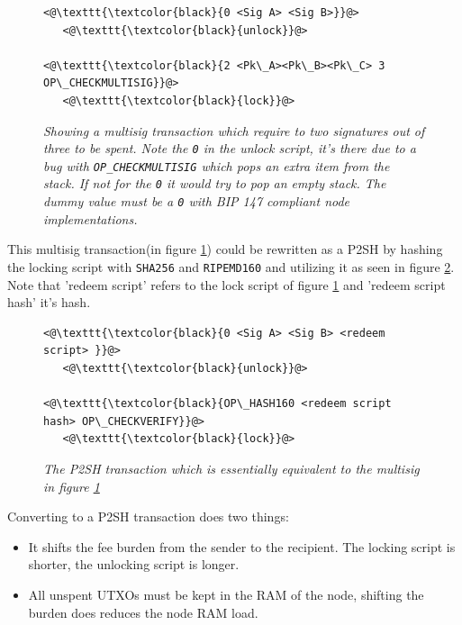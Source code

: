 \begin{figure}
	\centering
	\begin{lstlisting}
<@\texttt{\textcolor{black}{0 <Sig A> <Sig B>}}@>   
   <@\texttt{\textcolor{black}{unlock}}@>
	
<@\texttt{\textcolor{black}{2 <Pk\_A><Pk\_B><Pk\_C> 3 OP\_CHECKMULTISIG}}@>
   <@\texttt{\textcolor{black}{lock}}@>
	\end{lstlisting}
	
	\caption{\textit{ Showing a multisig transaction which require to two signatures out of three to be spent. Note the \texttt{0} in the unlock script, it's there due to a bug with \texttt{OP\_CHECKMULTISIG} which pops an extra item from the stack. If not for the \texttt{0} it would try to pop an empty stack. The dummy value must be a \texttt{0} with BIP 147 compliant node implementations\cite{bip:0147:dummy:zero}.
	}}
	\label{fig:cumbersome:script}
\end{figure} 

This multisig transaction(in figure \ref{fig:cumbersome:script}) could be rewritten as a P2SH by hashing the locking script with \texttt{SHA256} and  \texttt{RIPEMD160} and utilizing it as seen in figure \ref{fig:p2sh}. Note that 'redeem script' refers to the lock script of figure \ref{fig:cumbersome:script} and 'redeem script hash' it's hash.

\begin{figure}[hbt!]
	
	\begin{lstlisting}
<@\texttt{\textcolor{black}{0 <Sig A> <Sig B> <redeem script> }}@>   
   <@\texttt{\textcolor{black}{unlock}}@>
	
<@\texttt{\textcolor{black}{OP\_HASH160 <redeem script hash> OP\_CHECKVERIFY}}@>
   <@\texttt{\textcolor{black}{lock}}@>
	\end{lstlisting}
	
	\caption{\textit{ The P2SH transaction which is essentially equivalent to the multisig in figure \ref{fig:cumbersome:script}
	}}
	\label{fig:p2sh}
\end{figure}

Converting to a P2SH transaction does two things:

\begin{itemize}

	\item It shifts the fee burden from the sender to the recipient. The locking script is shorter, the unlocking script is longer.
	
	\item All unspent UTXOs must be kept in the RAM of the node, shifting the burden does reduces the node RAM load. 
	
\end{itemize}

